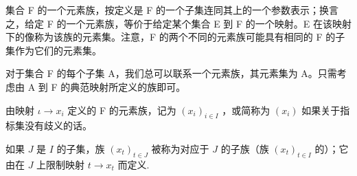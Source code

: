 集合 F 的一个元素族，按定义是 F 的一个子集连同其上的一个参数表示；换言之，给定 F 的一个元素族，等价于给定某个集合 E 到 F 的一个映射。E 在该映射下的像称为该族的元素集。注意，F 的两个不同的元素族可能具有相同的 F 的子集作为它们的元素集。

对于集合 F 的每个子集 A，我们总可以联系一个元素族，其元素集为 A。只需考虑由 A 到 F 的典范映射所定义的族即可。

由映射 \(\iota\to x_{i}\) 定义的 F 的元素族，记为 \((x_{i})_{i\in I}\) ，或简称为 \((x_{i})\) 如果关于指标集没有歧义的话。

如果 \(J\) 是 \(I\) 的子集，族 \((x_{t})_{t\in J}\) 被称为对应于 \(J\) 的子族（族 \((x_{t})_{t\in I}\) 的）；它由在 \(J\) 上限制映射 \(t\to x_t\) 而定义.

